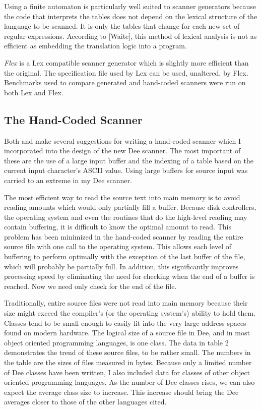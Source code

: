 Using a finite automaton is particularly well suited to scanner
generators because the code that interprets the tables does not depend
on the lexical structure of the language to be scanned.  It is only
the tables that change for each new set of regular expressions.
According to [Waite], this method of lexical analysis is not as
efficient as embedding the translation logic into a program.

{\em Flex} is a Lex compatible scanner generator which is slightly
more efficient than the original.  The specification file used by Lex
can be used, unaltered, by Flex.  Benchmarks used to compare generated
and hand-coded scanners were run on both Lex and Flex.

\subsection{The Hand-Coded Scanner}

Both \cite{Waite86} and \cite{Fraser91} make several suggestions for writing a
hand-coded scanner which I incorporated into the design of the new
Dee scanner.  The most important of these are the use of a large input
buffer and the indexing of a table based on the current input
character's ASCII value.  Using large buffers for source input was
carried to an extreme in my Dee scanner.

The most efficient way to read the source text into main memory is to
avoid reading amounts which would only partially fill a buffer.
Because disk controllers, the operating system and even the routines
that do the high-level reading may contain buffering, it is difficult
to know the optimal amount to read.  This problem has been minimized
in the hand-coded scanner by reading the entire source file with one
call to the operating system.  This allows each level of buffering to
perform optimally with the exception of the last buffer of the file,
which will probably be partially full.  In addition, this
significantly improves processing speed by eliminating the need for
checking when the end of a buffer is reached.  Now we need only check
for the end of the file.

Traditionally, entire source files were not read into main memory
because their size might exceed the compiler's (or the operating
system's) ability to hold them.  Classes tend to be small enough to
easily fit into the very large address spaces found on modern
hardware.  The logical size of a source file in Dee, and in most
object oriented programming languages, is one class.  The data in table
2 demonstrates the trend of these source files, to be rather small.
The numbers in the table are the sizes of files measured in bytes.
Because only a limited number of Dee classes have been written, I also
included data for classes of other object oriented programming
languages.  As the number of Dee classes rises, we can also expect the
average class size to increase.  This increase should bring the Dee
averages closer to those of the other languages cited.

